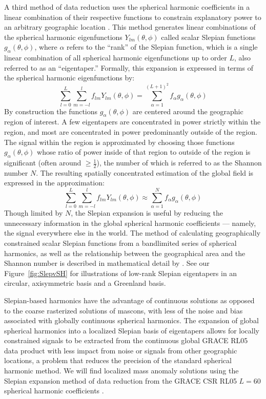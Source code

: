 {A third method of data reduction uses the spherical harmonic coefficients in a linear combination of their respective functions to
constrain explanatory power to an arbitrary geographic location \cite[][]{Simons+2006a}.
This method generates linear combinations of the spherical harmonic
eigenfunctions $Y_{lm}(\theta,\phi)$ called scalar Slepian functions
$g_{\alpha}(\theta,\phi)$, where $\alpha$ refers to the ``rank'' of the Slepian
function, which is a single linear combination of all spherical harmonic
eigenfunctions up to order $L$, also referred to as an ``eigentaper.'' Formally, this expansion is expressed in terms of the spherical harmonic eigenfunctions by:
\begin{equation}\label{eq:sh}
\sum_{l=0}^{L}\sum_{m=-l}^{l}f_{lm}Y_{lm}(\theta,\phi)= 
\sum_{\alpha=1}^{(L+1)^{2}}f_{\alpha}g_{\alpha}(\theta,\phi)
\end{equation}
	By construction the functions $g_{\alpha}(\theta,\phi)$ are centered around the geographic region of interest. A few eigentapers are concentrated in power strictly within the region, and most are concentrated in power predominantly outside of the region. The signal within the region is approximated by choosing those functions $g_{\alpha}(\theta,\phi)$ whose ratio of power inside of that region to outside of the region is significant (often around $\geq\frac{1}{2}$), the number of which is referred to as the Shannon number $N$. The resulting spatially concentrated estimation of the global field is expressed in the approximation:
\begin{equation}\label{eq:sh2sf}
\sum_{l=0}^{L}\sum_{m=-l}^{l}f_{lm}Y_{lm}(\theta,\phi)\approx 
\sum_{\alpha=1}^{N}f_{\alpha}g_{\alpha}(\theta,\phi)
\end{equation}
Though limited by $N$, the Slepian expansion is useful by reducing the
unnecessary information in the global spherical harmonic coefficients --- namely,
the signal everywhere else in the world. The method of calculating
geographically constrained scalar Slepian functions from a bandlimited series of
spherical harmonics, as well as the relationship between the geographical area
and the Shannon number is described in mathematical detail by
\cite{Simons+2006a}. See our Figure~\ref{fig:SlepvSH} for illustrations of low-rank
Slepian eigentapers in an circular, axisymmetric basis and a Greenland basis.

Slepian-based harmonics have the advantage of continuous solutions as opposed to
the coarse rasterized solutions of mascons, with less of the noise and bias
associated with globally continuous spherical harmonics. The expansion of global
spherical harmonics into a localized Slepian basis of eigentapers allows for
locally constrained signals to be extracted from the continuous global GRACE
RL05 data product with less impact from noise or signals from other geographic
locations, a problem that reduces the precision of the standard spherical
harmonic method. We will find localized mass anomaly solutions using the Slepian
expansion method of data reduction from the GRACE CSR
RL05 $L=60$ spherical harmonic coefficients \citep[see][]{Harig+2012}.


}
